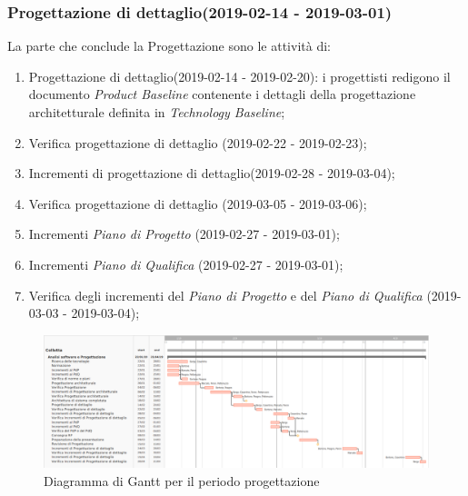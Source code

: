 		\subsubsection{Progettazione di dettaglio(2019-02-14 - 2019-03-01)\\} La parte che conclude la Progettazione sono le attività di:
			\begin{enumerate}[label = 3.3.\arabic*)]
				\item Progettazione di dettaglio(2019-02-14 - 2019-02-20): i progettisti redigono il documento \textit{Product Baseline} contenente i dettagli della progettazione architetturale definita in \textit{Technology Baseline};
				\item Verifica progettazione di dettaglio (2019-02-22 - 2019-02-23);
				\item Incrementi di progettazione di dettaglio(2019-02-28 - 2019-03-04);
				\item Verifica progettazione di dettaglio (2019-03-05 - 2019-03-06);
				\item Incrementi \textit{Piano di Progetto} (2019-02-27 - 2019-03-01);
				\item Incrementi \textit{Piano di Qualifica} (2019-02-27 - 2019-03-01);	
				\item Verifica degli incrementi del \textit{Piano di Progetto} e del \textit{Piano di Qualifica} (2019-03-03 - 2019-03-04);
			\end{enumerate}
	
	\begin{figure}[!hbtp]
		\centering
		\includegraphics[scale=0.5,angle=90]{images/ganttprog.png}
		\caption{Diagramma di Gantt per il periodo progettazione}
	\end{figure}
	
	\newpage	
